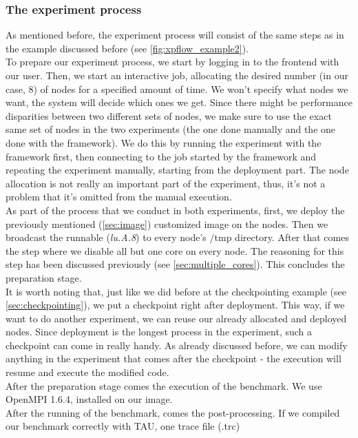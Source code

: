 \subsubsection{The experiment process}
\label{sec:experiment_process}
As mentioned before, the experiment process will consist of the same
steps as in the example discussed before
(see \ref{fig:xpflow_example2}).\\
To prepare our experiment process, we start by
logging in to the frontend with our user. Then, we start an
interactive job, allocating the desired number (in our case, 8) of
nodes for a specified amount of time. We won't specify what nodes we
want, the system will decide which ones we get. Since there might be
performance disparities between two different sets of nodes, we make
sure to use the exact same set of nodes in the two experiments (the
one done manually and the one done with the framework). We do this by
running the experiment with the framework first, then connecting to
the job started by the framework and repeating the experiment
manually, starting from the deployment part. The node allocation is
not really an important part of the experiment, thus, it's not a
problem that it's omitted from the manual execution.\\
As part of the process that we conduct in both experiments, first, we
deploy the previously mentioned (\ref{sec:image}) customized image on the
nodes. Then we broadcast the runnable (\emph{lu.A.8}) to every node's
/tmp directory. After that comes the step where we disable all but one
core on every node. The reasoning for this step has been discussed
previously (see \ref{sec:multiple_cores}). This concludes the
preparation stage.\\
It is worth noting that, just like we did before at the
checkpointing example (see \ref{sec:checkpointing}), we put a
checkpoint right after deployment. This way, if we want to do another
experiment, we can reuse our already allocated and deployed
nodes. Since deployment is the longest process in the experiment, such
a checkpoint can come in really handy. As already discussed before, we
can modify anything in the experiment that comes after the checkpoint
- the execution will resume and execute the modified code.\\
After the preparation stage comes the execution of the benchmark. We
use OpenMPI 1.6.4, installed on our image.\\
After the running of the benchmark, comes the post-processing. If we
compiled our benchmark correctly with TAU, one trace file (.trc)

